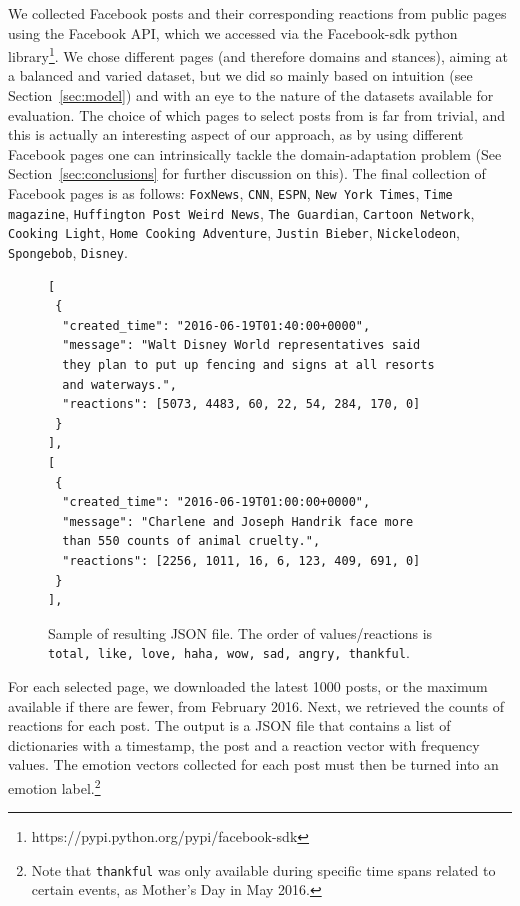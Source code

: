 \documentclass[11pt]{article}
\begin{document}
We collected Facebook posts and their corresponding reactions from public pages using the Facebook API, which we accessed via the Facebook-sdk python library\footnote{https://pypi.python.org/pypi/facebook-sdk}. We chose different pages (and therefore domains and stances), aiming at a balanced and varied dataset, but we did so mainly based on intuition (see Section~\ref{sec:model}) and with an eye to the nature of the datasets available for evaluation. The choice of which pages to select posts from is far from trivial, and this is actually an interesting aspect of our approach, as by using different Facebook pages one can intrinsically tackle the domain-adaptation problem (See Section~\ref{sec:conclusions} for further discussion on this). The final collection of Facebook pages is as follows: 
\texttt{FoxNews}, 
\texttt{CNN}, 
\texttt{ESPN}, 
\texttt{New York Times}, 
\texttt{Time magazine},
\texttt{Huffington Post Weird News}, 
\texttt{The Guardian}, 
\texttt{Cartoon Network}, 
\texttt{Cooking Light}, 
\texttt{Home Cooking Adventure}, 
\texttt{Justin Bieber}, 
\texttt{Nickelodeon}, 
\texttt{Spongebob}, 
\texttt{Disney}.


\begin{figure}
\vspace*{-.8cm}
\begin{Verbatim}[fontsize=\scriptsize]
[
 {
  "created_time": "2016-06-19T01:40:00+0000",
  "message": "Walt Disney World representatives said 
  they plan to put up fencing and signs at all resorts 
  and waterways.",
  "reactions": [5073, 4483, 60, 22, 54, 284, 170, 0]
 }
],
[
 {
  "created_time": "2016-06-19T01:00:00+0000",
  "message": "Charlene and Joseph Handrik face more
  than 550 counts of animal cruelty.",
  "reactions": [2256, 1011, 16, 6, 123, 409, 691, 0]
 }
],
\end{Verbatim}
\vspace*{-.8cm}
\caption{Sample of resulting JSON file\label{fig:json}. The order of values/reactions is \texttt{total, like, love, haha, wow, sad, angry, thankful}.}
\end{figure}


For each selected page, we downloaded the latest 1000 posts, or the maximum available if there are fewer, from February 2016.
Next, we retrieved the counts of reactions for each post. The output is a JSON file that contains a list of dictionaries with a timestamp, the post and a reaction vector with frequency values. The emotion vectors collected for each post must then be turned into an emotion label.\footnote{Note that \texttt{thankful} was only available during specific time spans related to certain events, as Mother's Day in May 2016.}
\end{document}

